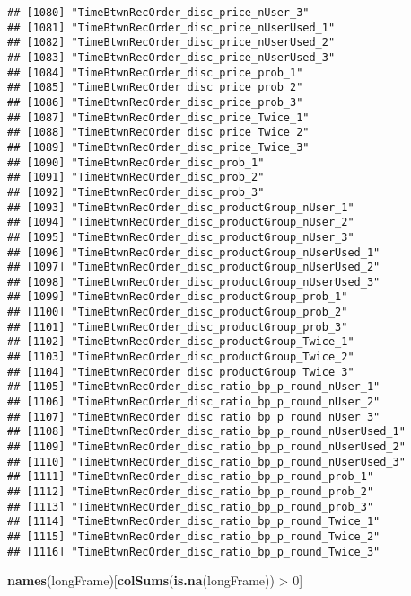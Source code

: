 \documentclass[10pt]{report}
\newenvironment{Shaded}{}{}
\newcommand{\KeywordTok}[1]{\textcolor[rgb]{0.00,0.44,0.13}{\textbf{{#1}}}}
\newcommand{\DecValTok}[1]{\textcolor[rgb]{0.25,0.63,0.44}{{#1}}}
\newcommand{\StringTok}[1]{\textcolor[rgb]{0.25,0.44,0.63}{{#1}}}
\newcommand{\NormalTok}[1]{{#1}}
\begin{document}
\begin{verbatim}
## [1080] "TimeBtwnRecOrder_disc_price_nUser_3"                  
## [1081] "TimeBtwnRecOrder_disc_price_nUserUsed_1"              
## [1082] "TimeBtwnRecOrder_disc_price_nUserUsed_2"              
## [1083] "TimeBtwnRecOrder_disc_price_nUserUsed_3"              
## [1084] "TimeBtwnRecOrder_disc_price_prob_1"                   
## [1085] "TimeBtwnRecOrder_disc_price_prob_2"                   
## [1086] "TimeBtwnRecOrder_disc_price_prob_3"                   
## [1087] "TimeBtwnRecOrder_disc_price_Twice_1"                  
## [1088] "TimeBtwnRecOrder_disc_price_Twice_2"                  
## [1089] "TimeBtwnRecOrder_disc_price_Twice_3"                  
## [1090] "TimeBtwnRecOrder_disc_prob_1"                         
## [1091] "TimeBtwnRecOrder_disc_prob_2"                         
## [1092] "TimeBtwnRecOrder_disc_prob_3"                         
## [1093] "TimeBtwnRecOrder_disc_productGroup_nUser_1"           
## [1094] "TimeBtwnRecOrder_disc_productGroup_nUser_2"           
## [1095] "TimeBtwnRecOrder_disc_productGroup_nUser_3"           
## [1096] "TimeBtwnRecOrder_disc_productGroup_nUserUsed_1"       
## [1097] "TimeBtwnRecOrder_disc_productGroup_nUserUsed_2"       
## [1098] "TimeBtwnRecOrder_disc_productGroup_nUserUsed_3"       
## [1099] "TimeBtwnRecOrder_disc_productGroup_prob_1"            
## [1100] "TimeBtwnRecOrder_disc_productGroup_prob_2"            
## [1101] "TimeBtwnRecOrder_disc_productGroup_prob_3"            
## [1102] "TimeBtwnRecOrder_disc_productGroup_Twice_1"           
## [1103] "TimeBtwnRecOrder_disc_productGroup_Twice_2"           
## [1104] "TimeBtwnRecOrder_disc_productGroup_Twice_3"           
## [1105] "TimeBtwnRecOrder_disc_ratio_bp_p_round_nUser_1"       
## [1106] "TimeBtwnRecOrder_disc_ratio_bp_p_round_nUser_2"       
## [1107] "TimeBtwnRecOrder_disc_ratio_bp_p_round_nUser_3"       
## [1108] "TimeBtwnRecOrder_disc_ratio_bp_p_round_nUserUsed_1"   
## [1109] "TimeBtwnRecOrder_disc_ratio_bp_p_round_nUserUsed_2"   
## [1110] "TimeBtwnRecOrder_disc_ratio_bp_p_round_nUserUsed_3"   
## [1111] "TimeBtwnRecOrder_disc_ratio_bp_p_round_prob_1"        
## [1112] "TimeBtwnRecOrder_disc_ratio_bp_p_round_prob_2"        
## [1113] "TimeBtwnRecOrder_disc_ratio_bp_p_round_prob_3"        
## [1114] "TimeBtwnRecOrder_disc_ratio_bp_p_round_Twice_1"       
## [1115] "TimeBtwnRecOrder_disc_ratio_bp_p_round_Twice_2"       
## [1116] "TimeBtwnRecOrder_disc_ratio_bp_p_round_Twice_3"
\end{verbatim}

\begin{Shaded}
\begin{Highlighting}[]
\KeywordTok{names}\NormalTok{(longFrame)[}\KeywordTok{colSums}\NormalTok{(}\KeywordTok{is.na}\NormalTok{(longFrame)) >}\StringTok{ }\DecValTok{0}\NormalTok{]}
\end{Highlighting}
\end{Shaded}
\end{document}
